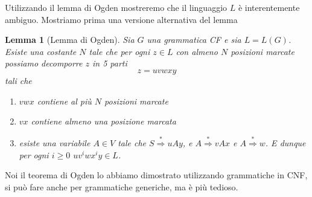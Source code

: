 \documentclass[12pt]{report}
\newtheorem{lemma}{Lemma}
\theoremstyle{definition}
\begin{document}
Utilizzando il lemma di Ogden mostreremo che il linguaggio $L$ è interentemente ambiguo.
Mostriamo prima una versione alternativa del lemma
\begin{lemma}[Lemma di Ogden]
	Sia $G$ una grammatica CF e sia $L = L(G)$.
	Esiste una costante $N$ tale che per ogni $z \in L$ con almeno $N$ posizioni marcate possiamo decomporre $z$ in 5 parti
	$$ z = uvwxy $$
	tali che
	\begin{enumerate}
		\item $vwx$ contiene al più $N$ posizioni marcate
		\item $vx$ contiene almeno una posizione marcata
		\item esiste una variabile $A \in V$ tale che $S \overset{*}{\Rightarrow} uAy$, e $A \overset{*}{\Rightarrow} vAx$ e $A \overset{*}{\Rightarrow} w$.
			E dunque per ogni $i \geq 0$ $u v^i w x^i y \in L$.
	\end{enumerate}
\end{lemma}
Noi il teorema di Ogden lo abbiamo dimostrato utilizzando grammatiche in CNF, si può fare anche per grammatiche generiche, ma è più tedioso.
\end{document}

